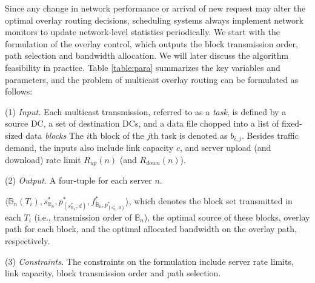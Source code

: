 Since any change in network performance or arrival of
new request may alter the optimal overlay
routing decisions, scheduling systems always implement network monitors to update network-level statistics periodically. We start with the formulation of the overlay control, which outputs the block transmission order, path selection and bandwidth allocation. We will later discuss the algorithm feasibility in practice. 
Table \ref{table:para} summarizes the key variables and parameters, and the problem of multicast overlay routing can be formulated as follows:


\noindent(1) {\em Input.} %
Each multicast transmission, referred to as a {\em task}, is defined
by a source DC, a set of destination DCs, and a data file chopped into
a list of fixed-sized data
{\em blocks}
The $i$th block of the $j$th task is denoted as $b_{i,j}$.
Besides traffic demand, the inputs also include link capacity $c$, and
server upload (and download) rate limit $R_{up}(n)$ (and $R_{down}(n)$).

\noindent(2) {\em Output.} A four-tuple for each server $n$.

$\langle \mathbb{B}_n(T_i), s_{\mathbb{B}_n}^*, p^*_{(s^*_{\mathbb{B}_n},d)}, f^*_{\mathbb{B}_n,p^*_{(s^*_{\mathbb{B}_n},d)}} \rangle$, which denotes the block set transmitted in each $T_i$ (i.e., transmission order of $\mathbb{B}_n$), the optimal source of these blocks, overlay path for each block, and the optimal allocated bandwidth on the overlay path, respectively.

\noindent(3) {\em Constraints.}
The constraints on the formulation include server rate limits, link capacity, block transmission order and path selection.

